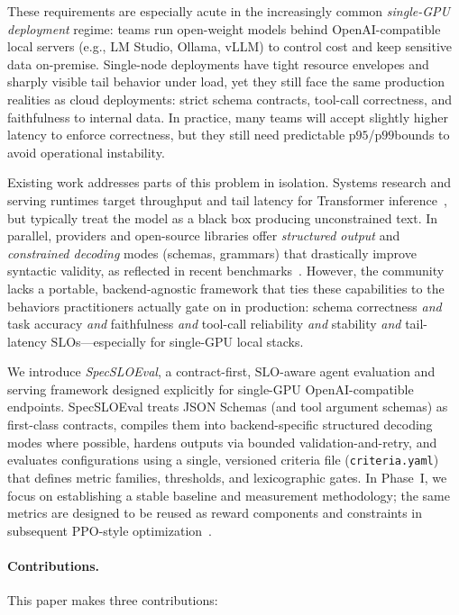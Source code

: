 \documentclass[11pt]{article}
\newcommand{\pninetyfive}{\ensuremath{\mathrm{p95}}}
\newcommand{\pninetynine}{\ensuremath{\mathrm{p99}}}
\newcommand{\slo}{\ensuremath{\mathrm{SLO}}}
\begin{document}
These requirements are especially acute in the increasingly common \emph{single-GPU deployment} regime:
teams run open-weight models behind OpenAI-compatible local servers (e.g., LM Studio, Ollama, vLLM) to control cost and keep sensitive data on-premise.
Single-node deployments have tight resource envelopes and sharply visible tail behavior under load, yet they still face the same production realities as cloud deployments: strict schema contracts, tool-call correctness, and faithfulness to internal data.
In practice, many teams will accept slightly higher latency to enforce correctness, but they still need predictable \pninetyfive/\pninetynine bounds to avoid operational instability.

Existing work addresses parts of this problem in isolation.
Systems research and serving runtimes target throughput and tail latency for Transformer inference~\citep{kwon2023vllm,zheng2023sglang,agrawal2024sarathi}, but typically treat the model as a black box producing unconstrained text.
In parallel, providers and open-source libraries offer \emph{structured output} and \emph{constrained decoding} modes (schemas, grammars) that drastically improve syntactic validity, as reflected in recent benchmarks~\citep{geng2025jsonschemabench,letmespeakfreely,openaiStructuredOutputs}.
However, the community lacks a portable, backend-agnostic framework that ties these capabilities to the behaviors practitioners actually gate on in production:
schema correctness \emph{and} task accuracy \emph{and} faithfulness \emph{and} tool-call reliability \emph{and} stability \emph{and} tail-latency \slo s---especially for single-GPU local stacks.

We introduce \emph{SpecSLOEval}, a contract-first, \slo-aware agent evaluation and serving framework designed explicitly for single-GPU OpenAI-compatible endpoints.
SpecSLOEval treats JSON Schemas (and tool argument schemas) as first-class contracts, compiles them into backend-specific structured decoding modes where possible, hardens outputs via bounded validation-and-retry, and evaluates configurations using a single, versioned criteria file (\texttt{criteria.yaml}) that defines metric families, thresholds, and lexicographic gates.
In Phase~I, we focus on establishing a stable baseline and measurement methodology; the same metrics are designed to be reused as reward components and constraints in subsequent PPO-style optimization~\citep{schulman2017ppo,dettmers2023qlora}.

\paragraph{Contributions.}
This paper makes three contributions:
\end{document}
